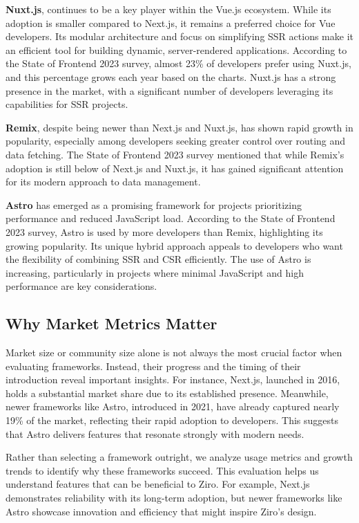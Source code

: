 \textbf{Nuxt.js}, continues to be a key player within the Vue.js ecosystem. While its adoption is smaller compared to Next.js, it remains a preferred choice for Vue developers. Its modular architecture and focus on simplifying SSR actions make it an efficient tool for building dynamic, server-rendered applications. According to the State of Frontend 2023 survey, almost 23\% of developers prefer using Nuxt.js, and this percentage grows each year based on the charts. Nuxt.js has a strong presence in the market, with a significant number of developers leveraging its capabilities for SSR projects.

\textbf{Remix}, despite being newer than Next.js and Nuxt.js, has shown rapid growth in popularity, especially among developers seeking greater control over routing and data fetching. The State of Frontend 2023 survey mentioned that while Remix’s adoption is still below of Next.js and Nuxt.js, it has gained significant attention for its modern approach to data management.

\textbf{Astro} has emerged as a promising framework for projects prioritizing performance and reduced JavaScript load. According to the State of Frontend 2023 survey, Astro is used by more developers than Remix, highlighting its growing popularity. Its unique hybrid approach appeals to developers who want the flexibility of combining SSR and CSR efficiently. The use of Astro is increasing, particularly in projects where minimal JavaScript and high performance are key considerations.

\subsection{Why Market Metrics Matter}

Market size or community size alone is not always the most crucial factor when evaluating frameworks. Instead, their progress and the timing of their introduction reveal important insights. For instance, Next.js, launched in 2016, holds a substantial market share due to its established presence. Meanwhile, newer frameworks like Astro, introduced in 2021, have already captured nearly 19\% of the market, reflecting their rapid adoption to developers. This suggests that Astro delivers features that resonate strongly with modern needs.

Rather than selecting a framework outright, we analyze usage metrics and growth trends to identify why these frameworks succeed. This evaluation helps us understand features that can be beneficial to Ziro. For example, Next.js demonstrates reliability with its long-term adoption, but newer frameworks like Astro showcase innovation and efficiency that might inspire Ziro’s design.

